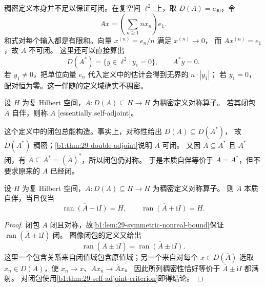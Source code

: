 稠密定义本身并不足以保证可闭。在复空间 \(\ell^2\) 上，取 \(D(A)=c_{00}\)，令
\[
 Ax=\left(\sum_{n\geq1}n x_n\right)e_1.
\]
和式对每个输入都是有限和。向量 \(x^{(n)}=e_n/n\) 满足 \(x^{(n)}\to0\)，
而 \(Ax^{(n)}=e_1\)，故 \(A\) 不可闭。
这里还可以直接算出
\[
 D(A^*)=\{y\in\ell^2:y_1=0\},\qquad A^*y=0.
\]
若 \(y_1\ne0\)，把单位向量 \(e_n\) 代入定义中的估计会得到无界的 \(n\cdot|y_1|\)；
若 \(y_1=0\)，配对恒为零。这一伴随的定义域确实不稠密。

\begin{definition}[本质自伴]
\label{b1:def:29-essentially-self-adjoint}
设 \(H\) 为复 Hilbert 空间，\(A:D(A)\subseteq H\to H\) 为稠密定义对称算子。
若其闭包 \(\overline A\) 自伴，则称 \(A\) [essentially self-adjoint]。
\end{definition}

这个定义中的闭包总能构造。事实上，对称性给出 \(D(A)\subseteq D(A^*)\)，
故 \(D(A^*)\) 稠密；\cref{b1:thm:29-double-adjoint}说明 \(A\) 可闭。
又因 \(A\subseteq A^*\) 且 \(A^*\) 闭，有
\(\overline A\subseteq A^*=(\overline A)^*\)，所以闭包仍对称。
于是本质自伴等价于 \(\overline A=A^*\)，但不要求原来的 \(A\) 已经闭。

\begin{corollary}[本质自伴性的稠密值域判据]
\label{b1:cor:29-essential-self-adjoint}
设 \(H\) 为复 Hilbert 空间，\(A:D(A)\subseteq H\to H\) 为稠密定义对称算子。
则 \(A\) 本质自伴，当且仅当
\[
 \overline{\operatorname{ran}(A-\mathrm iI)}=H,
 \qquad \overline{\operatorname{ran}(A+\mathrm iI)}=H.
\]
\end{corollary}
\begin{proof}
闭包 \(\overline A\) 闭且对称，故\cref{b1:lem:29-symmetric-nonreal-bound}保证
\(\operatorname{ran}(\overline A\pm\mathrm iI)\) 闭。
图像闭包的定义又给出
\[
 \operatorname{ran}(\overline A\pm\mathrm iI)
 =\overline{\operatorname{ran}(A\pm\mathrm iI)}.
\]
这里一个包含关系来自闭值域包含原值域；另一个来自对每个
\(x\in D(\overline A)\) 选取 \(x_n\in D(A)\)，使
\(x_n\to x\)、\(Ax_n\to\overline Ax\)。
因此所列稠密性恰好等价于 \(\overline A\pm\mathrm iI\) 都满射。
对闭包使用\cref{b1:thm:29-self-adjoint-criterion}即得结论。
\end{proof}
